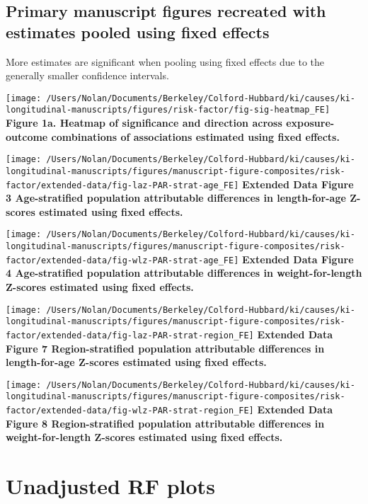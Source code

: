 \documentclass[9pt,]{book}
\begin{document}
\section{Primary manuscript figures recreated with estimates pooled
using fixed
effects}\label{primary-manuscript-figures-recreated-with-estimates-pooled-using-fixed-effects}

More estimates are significant when pooling using fixed effects due to
the generally smaller confidence intervals.

\texttt{[image: /Users/Nolan/Documents/Berkeley/Colford-Hubbard/ki/causes/ki-longitudinal-manuscripts/figures/risk-factor/fig-sig-heatmap\_FE]}
\textbf{Figure 1a. Heatmap of significance and direction across
exposure-outcome combinations of associations estimated using fixed
effects. }

\texttt{[image: /Users/Nolan/Documents/Berkeley/Colford-Hubbard/ki/causes/ki-longitudinal-manuscripts/figures/manuscript-figure-composites/risk-factor/extended-data/fig-laz-PAR-strat-age\_FE]}
\textbf{Extended Data Figure 3 \textbar{} Age-stratified population
attributable differences in length-for-age Z-scores estimated using
fixed effects. }

\texttt{[image: /Users/Nolan/Documents/Berkeley/Colford-Hubbard/ki/causes/ki-longitudinal-manuscripts/figures/manuscript-figure-composites/risk-factor/extended-data/fig-wlz-PAR-strat-age\_FE]}
\textbf{Extended Data Figure 4 \textbar{} Age-stratified population
attributable differences in weight-for-length Z-scores estimated using
fixed effects. }

\texttt{[image: /Users/Nolan/Documents/Berkeley/Colford-Hubbard/ki/causes/ki-longitudinal-manuscripts/figures/manuscript-figure-composites/risk-factor/extended-data/fig-laz-PAR-strat-region\_FE]}
\textbf{Extended Data Figure 7 \textbar{} Region-stratified population
attributable differences in length-for-age Z-scores estimated using
fixed effects. }

\texttt{[image: /Users/Nolan/Documents/Berkeley/Colford-Hubbard/ki/causes/ki-longitudinal-manuscripts/figures/manuscript-figure-composites/risk-factor/extended-data/fig-wlz-PAR-strat-region\_FE]}
\textbf{Extended Data Figure 8 \textbar{} Region-stratified population
attributable differences in weight-for-length Z-scores estimated using
fixed effects. }

\chapter{Unadjusted RF plots}\label{unadjusted}
\end{document}
